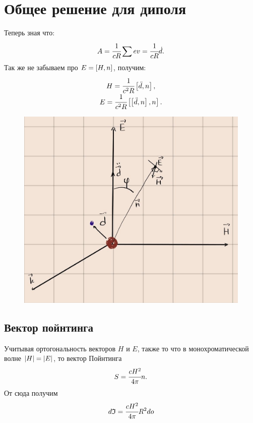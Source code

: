 
\section{Общее решение для диполя}

Теперь зная что:
\begin{equation}
    A = \cfrac{1}{cR} \sum ev = \cfrac{1}{cR} \dot d.
\end{equation}
Так же не забываем про $E = \left[ H, n \right]$, получим:
\begin{eqnarray}
    \begin{matrix}
        H = \cfrac{1}{c^2R}\left[ \ddot d, n \right], \\
        E = \cfrac{1}{c^2R}\left[ \left[ \ddot d, n \right], n \right].
    \end{matrix}
    \label{eq:2.5}
\end{eqnarray}
\begin{figure}[H]
    \centering
    \includegraphics[trim={0 0 0 0},clip,width=\textwidth]{sours_img/sh.jpg}
    \label{pict}
\end{figure}

\subsection{Вектор пойнтинга}
Учитывая ортогональность векторов $H$ и $E$, также то что в 
монохроматической волне $\abs{H} = \abs{E}$, то вектор Пойнтинга
\begin{equation}
    S = \cfrac{cH^2}{4\pi}n.
\end{equation}
От сюда получим 
\begin{equation}
    d\mathfrak{I} = \cfrac{cH^2}{4\pi}R^2do
    \label{eq:2.7}
\end{equation}


